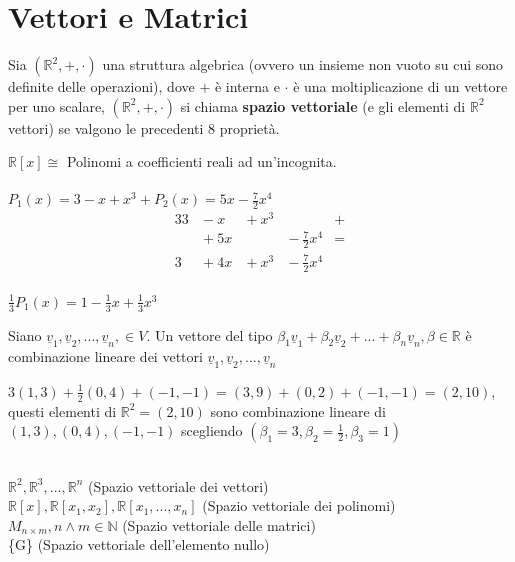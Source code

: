\chapter{Vettori e Matrici}

Sia $(\mathbb{R}^{2},+,\cdot)$ una struttura algebrica (ovvero un
insieme non vuoto su cui sono definite delle operazioni), dove $+$ è
interna e $\cdot$ è una moltiplicazione di un vettore per uno
scalare, $(\mathbb{R}^{2},+,\cdot)$ si chiama \textbf{spazio
vettoriale} (e gli elementi di $\mathbb{R}^{2}$ vettori) se valgono
le precedenti 8 proprietà.

\begin{es}
  $\mathbb{R}[x] \cong$ Polinomi a coefficienti reali ad un'incognita.\\\\
  $P_{1}(x)=3-x+x^{3} + P_{2}(x)=5x-\frac{7}{2}x^{4}$
  \begin{alignat*}{3}
    3 &{}- x&{}+ x^{3}&  &{}+\\
    &{}+ 5x&{} &{}- \frac{7}{2}x^{4}&{}=\\
    3 &{}+ 4x&{}+ x^{3}&{}- \frac{7}{2}x^{4}&
  \end{alignat*}\\
  $\frac{1}{3}P_{1}(x)=1-\frac{1}{3}x+\frac{1}{3}x^{3}$
\end{es}

\begin{definizione}
  Siano $\underline{v}_{1},\underline{v}_{2},...,\underline{v}_{n},
  \in V$. Un vettore del tipo $\beta_1 \underline{v} _1+\beta_2
  \underline{v} _2+...+\beta_n \underline{v} _n, \beta\in \mathbb{R}$
  è combinazione lineare dei vettori $\underline{v}
  _{1},\underline{v} _{2},...,\underline{v} _{n}$
  \begin{es}
    $3(1,3)+\frac{1}{2}(0,4)+(-1,-1)=(3,9)+(0,2)+(-1,-1)=(2,10)$,
    questi elementi di $\mathbb{R}^2=(2,10)$ sono combinazione
    lineare di $(1,3),(0,4),(-1,-1)$ scegliendo $(\beta_1=3,
    \beta_2=\frac{1}{2}, \beta_3=1)$
  \end{es}
\end{definizione}

\begin{es}
  \phantom{}\\
  $\mathbb{R}^2, \mathbb{R}^3,...,\mathbb{R}^n$ (Spazio vettoriale
  dei vettori)\\
  $\mathbb{R}[x], \mathbb{R}[x_1,x_2], \mathbb{R}[x_1,...,x_n]$
  (Spazio vettoriale dei polinomi)\\
  $M_{n\times m}, n\wedge m\in \mathbb{N}$ (Spazio vettoriale delle matrici)\\
  \{G\} (Spazio vettoriale dell'elemento nullo)
\end{es}

